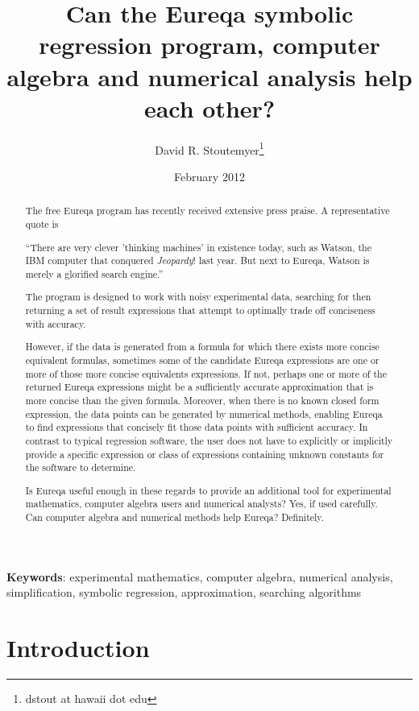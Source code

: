 \documentclass[12pt,english]{article}
\begin{document}
\title{Can the Eureqa symbolic regression program, computer algebra and
numerical analysis help each other?}


\author{David R. Stoutemyer\thanks{dstout at hawaii dot edu}}


\date{February 2012}
\maketitle
\begin{abstract}
The free Eureqa program has recently received extensive press praise.
A representative quote is

{}``There are very clever 'thinking machines' in existence today,
such as Watson, the IBM computer that conquered \emph{Jeopardy}! last
year. But next to Eureqa, Watson is merely a glorified search engine.''

The program is designed to work with noisy experimental data, searching
for then returning a set of result expressions that attempt to optimally
trade off conciseness with accuracy.

However, if the data is generated from a formula for which there exists
more concise equivalent formulas, sometimes some of the candidate
Eureqa expressions are one or more of those more concise equivalents
expressions. If not, perhaps one or more of the returned Eureqa expressions
might be a sufficiently accurate approximation that is more concise
than the given formula. Moreover, when there is no known closed form
expression, the data points can be generated by numerical methods,
enabling Eureqa to find expressions that concisely fit those data
points with sufficient accuracy. In contrast to typical regression
software, the user does not have to explicitly or implicitly provide
a specific expression or class of expressions containing unknown constants
for the software to determine.

Is Eureqa useful enough in these regards to provide an additional
tool for experimental mathematics, computer algebra users and numerical
analysts? Yes, if used carefully. Can computer algebra and numerical
methods help Eureqa? Definitely.
\end{abstract}
\textbf{Keywords}: experimental mathematics, computer algebra, numerical
analysis, simplification, symbolic regression, approximation, searching
algorithms

\medskip{}



\section{Introduction\label{sec:Introduction}}
\end{document}
